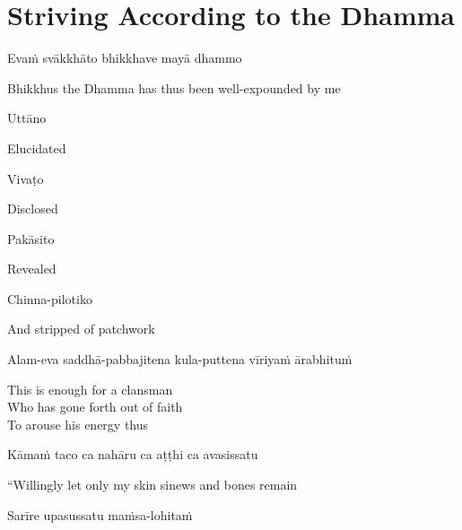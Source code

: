 \suttaRef{[AN 6.22 \& 8.79]}


\section{Striving According to the Dhamma}
\label{striving-according-to-dhamma}

\begin{leader}
\end{leader}

Evaṁ svākkhāto bhikkhave mayā dhammo

\begin{english}
  Bhikkhus the Dhamma has thus been well-expounded by me
\end{english}

Uttāno

\begin{english}
  Elucidated
\end{english}

Vivaṭo

\begin{english}
  Disclosed
\end{english}

Pakāsito

\begin{english}
  Revealed
\end{english}

Chinna-pilotiko

\begin{english}
  And stripped of patchwork
\end{english}

Alam-eva saddhā-pabbajitena kula-puttena vīriyaṁ ārabhituṁ

\begin{english}
  This is enough for a clansman\\
  Who has gone forth out of faith\\
  To arouse his energy thus
\end{english}

Kāmaṁ taco ca nahāru ca aṭṭhi ca avasissatu

\begin{english}
  “Willingly let only my skin  sinews  and bones remain
\end{english}

Sarīre upasussatu maṁsa-lohitaṁ

